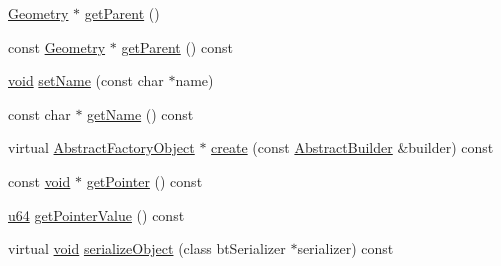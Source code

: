 \begin{DoxyCompactItemize}
\item 
\mbox{\hyperlink{classnjli_1_1_geometry}{Geometry}} $\ast$ \mbox{\hyperlink{classnjli_1_1_shader_program_a663abf703712e6cbdffd9ac7ee2631b9}{get\+Parent}} ()
\item 
const \mbox{\hyperlink{classnjli_1_1_geometry}{Geometry}} $\ast$ \mbox{\hyperlink{classnjli_1_1_shader_program_af1c05ca7d7c97f0abeedf3c34426ddc1}{get\+Parent}} () const
\item 
\mbox{\hyperlink{_thread_8h_af1e856da2e658414cb2456cb6f7ebc66}{void}} \mbox{\hyperlink{classnjli_1_1_shader_program_a087eb5f8d9f51cc476f12f1d10a3cb95}{set\+Name}} (const char $\ast$name)
\item 
const char $\ast$ \mbox{\hyperlink{classnjli_1_1_shader_program_ad41266885be835f3ee602311e20877a4}{get\+Name}} () const
\item 
virtual \mbox{\hyperlink{classnjli_1_1_abstract_factory_object}{Abstract\+Factory\+Object}} $\ast$ \mbox{\hyperlink{classnjli_1_1_shader_program_a83a8876ae63b92804004cf3febe76573}{create}} (const \mbox{\hyperlink{classnjli_1_1_abstract_builder}{Abstract\+Builder}} \&builder) const
\item 
const \mbox{\hyperlink{_thread_8h_af1e856da2e658414cb2456cb6f7ebc66}{void}} $\ast$ \mbox{\hyperlink{classnjli_1_1_shader_program_ac4ca71716ed832be357f15f8262c8448}{get\+Pointer}} () const
\item 
\mbox{\hyperlink{_util_8h_ad758b7a5c3f18ed79d2fcd23d9f16357}{u64}} \mbox{\hyperlink{classnjli_1_1_shader_program_a4ffddf141a426a5a07d0ac19f1913811}{get\+Pointer\+Value}} () const
\item 
virtual \mbox{\hyperlink{_thread_8h_af1e856da2e658414cb2456cb6f7ebc66}{void}} \mbox{\hyperlink{classnjli_1_1_shader_program_a4fc4bcd9d1930911474210c047372fc0}{serialize\+Object}} (class bt\+Serializer $\ast$serializer) const
\end{DoxyCompactItemize}
